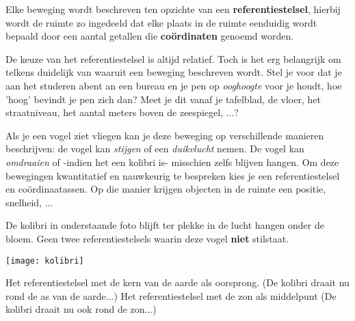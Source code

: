 \documentclass{ximera}
\begin{document}
	\author{Bart Lambregs}
    \xmsource\xmuitleg


Elke beweging wordt beschreven ten opzichte van een \textbf{referentiestelsel}, hierbij wordt de ruimte zo ingedeeld dat elke plaats in de ruimte eenduidig wordt bepaald door een aantal getallen die \textbf{coördinaten} genoemd worden. 

De keuze van het referentiestelsel is altijd relatief. Toch is het erg belangrijk om telkens duidelijk van waaruit een beweging beschreven wordt. Stel je voor dat je aan het studeren abent an een bureau en je pen op \textit{ooghoogte} voor je houdt, hoe 'hoog' bevindt je pen zich dan? Meet je dit vanaf je tafelblad, de vloer, het straatniveau, het aantal meters boven de zeespiegel, ...? 

Als je een vogel ziet vliegen kan je deze beweging op verschillende manieren beschrijven: de vogel kan \textit{stijgen} of een \textit{duikvlucht} nemen. De vogel kan \textit{omdraaien} of -indien het een kolibri is- misschien zelfs blijven hangen. Om deze bewegingen kwantitatief en nauwkeurig te bespreken kies je een referentiestelsel en coördinaatassen. Op die manier krijgen objecten in de ruimte een positie, snelheid, ... 

\begin{exercise}
De kolibri in onderstaande foto blijft ter plekke in de lucht hangen onder de bloem. Geen twee referentiestelsels waarin deze vogel \textbf{niet} stilstaat. 

\begin{image}
	\texttt{[image: kolibri]}
\end{image}

\begin{oplossing}
Het referentiestelsel met de kern van de aarde als oorsprong. (De kolibri draait nu rond de as van de aarde...)
Het referentiestelsel met de zon als middelpunt (De kolibri draait nu ook rond de zon...)
\end{oplossing}

\end{exercise}
\end{document}
